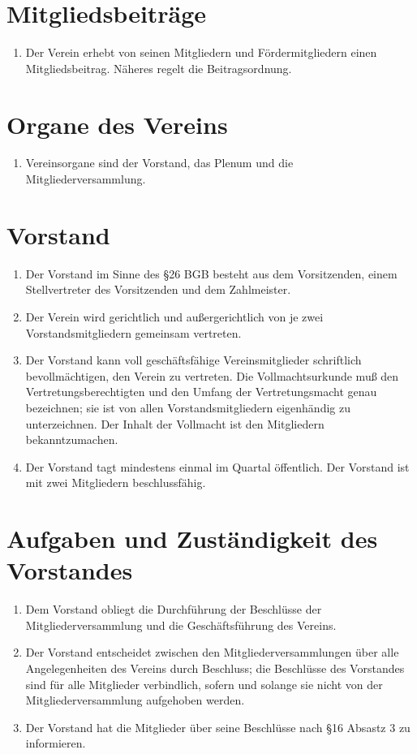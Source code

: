 \documentclass[ngerman]{scrartcl}
\begin{document}
\section{Mitgliedsbeiträge} \label{sec:mitgliedsbeitraege}
\begin{enumerate}
 \item Der Verein erhebt von seinen Mitgliedern und Fördermitgliedern einen Mitgliedsbeitrag. Näheres regelt die Beitragsordnung.
\end{enumerate}
\section{Organe des Vereins} \label{sec:organe_des_vereins}
\begin{enumerate}
 \item Vereinsorgane sind der Vorstand, das Plenum und die Mitgliederversammlung.
\end{enumerate}
\section{Vorstand} \label{sec:vostand}
\begin{enumerate}
 \item Der Vorstand im Sinne des §26 BGB besteht aus dem
 Vorsitzenden, einem Stellvertreter des Vorsitzenden und dem
 Zahlmeister.
 \item Der Verein wird gerichtlich und außergerichtlich von je
 zwei Vorstandsmitgliedern gemeinsam vertreten.
 \item Der Vorstand kann voll geschäftsfähige Vereinsmitglieder
 schriftlich bevollmächtigen, den Verein zu vertreten. Die
 Vollmachtsurkunde muß den Vertretungsberechtigten und den
 Umfang der Vertretungsmacht genau bezeichnen; sie ist von
 allen Vorstandsmitgliedern eigenhändig zu unterzeichnen. Der
 Inhalt der Vollmacht ist den Mitgliedern bekanntzumachen.
 \item Der Vorstand tagt mindestens einmal im Quartal öffentlich.
 Der Vorstand ist mit zwei Mitgliedern beschlussfähig.
\end{enumerate}
\section{Aufgaben und Zuständigkeit des Vorstandes}
\begin{enumerate}
 \item Dem Vorstand obliegt die Durchführung der Beschlüsse der
 Mitgliederversammlung und die Geschäftsführung des Vereins.
 \item Der Vorstand entscheidet zwischen den
 Mitgliederversammlungen über alle Angelegenheiten des Vereins
 durch Beschluss; die Beschlüsse des Vorstandes sind für alle
 Mitglieder verbindlich, sofern und solange sie nicht von der
 Mitgliederversammlung aufgehoben werden.
\item Der Vorstand hat die Mitglieder über seine Beschlüsse nach 
 §16 Absastz 3 zu informieren.
\end{enumerate}
\end{document}
